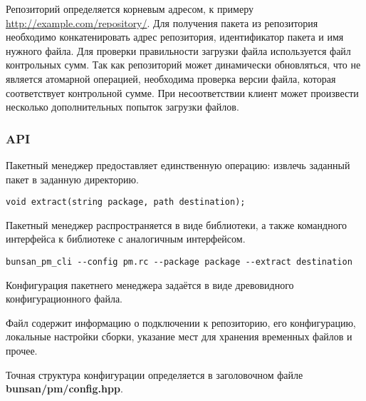 Репозиторий определяется корневым адресом, к примеру \url{http://example.com/repository/}.
Для получения пакета из репозитория необходимо конкатенировать адрес репозитория,
идентификатор пакета и имя нужного файла. Для проверки правильности загрузки файла
используется файл контрольных сумм. Так как репозиторий может динамически обновляться,
что не является атомарной операцией, необходима проверка версии файла, которая соответствует
контрольной сумме. При несоответствии клиент может произвести несколько дополнительных
попыток загрузки файлов.

\subsubsection{API}
Пакетный менеджер предоставляет единственную операцию:
извлечь заданный пакет в заданную директорию.

\begin{verbatim}
void extract(string package, path destination);
\end{verbatim}

Пакетный менеджер распространяется в виде библиотеки,
а также командного интерфейса к библиотеке с аналогичным интерфейсом.

\begin{verbatim}
bunsan_pm_cli --config pm.rc --package package --extract destination
\end{verbatim}

Конфигурация пакетнего менеджера задаётся в виде древовидного
конфигурационного файла.

Файл содержит информацию о подключении к репозиторию, его конфигурацию,
локальные настройки сборки, указание мест для хранения временных файлов и прочее.

Точная структура конфигурации определяется в заголовочном файле
\textbf{bunsan/pm/config.hpp}.